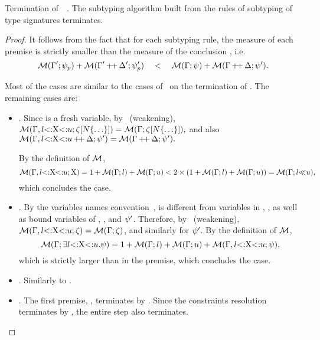 \begin{theorem}{Termination of\ \ .}%
\label{thm:subtysig-terminates}
    The subtyping algorithm built from the rules of
    subtyping of type signatures
     terminates.
\end{theorem}
\begin{proof}
    It follows from the fact that for each subtyping rule, 
    the measure of each premise 
    is strictly smaller than the measure 
    of the conclusion , i.e.
    \[\operatorname{\mathcal{M}}(\Gamma';\psi_p) + \operatorname{\mathcal{M}}(\Gamma'\operatorname{+\!+}\Delta';\psi'_p) \quad<\quad 
    \operatorname{\mathcal{M}}(\Gamma;\psi) + \operatorname{\mathcal{M}}(\Gamma\operatorname{+\!+}\Delta;\psi').\]

    Most of the cases are similar to the cases of~
    on the termination of .
    The remaining cases are:
    \begin{itemize}
        \item {}. Since \vx is a fresh variable,
            by~ (weakening),
            $\operatorname{\mathcal{M}}(\Gamma, l{\operatorname{<:}}\mathrm{X}{\operatorname{<:}}u;\zeta[N\{\ldots\}]) = 
            \operatorname{\mathcal{M}}(\Gamma;\zeta[N\{\ldots\}]),$ and also
            $\operatorname{\mathcal{M}}(\Gamma, l{\operatorname{<:}}\mathrm{X}{\operatorname{<:}}u\operatorname{+\!+}\Delta;\psi')
            = \operatorname{\mathcal{M}}(\Gamma\operatorname{+\!+}\Delta;\psi').$

            By the definition of $\operatorname{\mathcal{M}}$,
            \[\operatorname{\mathcal{M}}(\Gamma, l{\operatorname{<:}}\mathrm{X}{\operatorname{<:}}u;\mathrm{X}) =
            1 + \operatorname{\mathcal{M}}(\Gamma;l) + \operatorname{\mathcal{M}}(\Gamma;u) <
            2\times(1 + \operatorname{\mathcal{M}}(\Gamma;l) + \operatorname{\mathcal{M}}(\Gamma;u)) =
            \operatorname{\mathcal{M}}(\Gamma;l{\operatorname{\ll}}u),\]
            which concludes the case.
        \item {}. By the variables names
            convention~, \vx is different from variables
            in \AEnv, \UEnv, as well as bound variables of \dctxsig, \tysig,
            and $\psi'$. Therefore, by~ (weakening),
            $\operatorname{\mathcal{M}}(\Gamma, l{\operatorname{<:}}\mathrm{X}{\operatorname{<:}}u;\zeta) = 
            \operatorname{\mathcal{M}}(\Gamma;\zeta)$, and similarly for $\psi'$.
            By the definition of $\operatorname{\mathcal{M}}$,
            \[\operatorname{\mathcal{M}}(\Gamma;\exists l{\operatorname{<:}}\mathrm{X}{\operatorname{<:}}u.\psi) = 1 +
                \operatorname{\mathcal{M}}(\Gamma;l) + \operatorname{\mathcal{M}}(\Gamma;u) + 
                \operatorname{\mathcal{M}}(\Gamma, l{\operatorname{<:}}\mathrm{X}{\operatorname{<:}}u;\psi),\]
            which is strictly larger than
            \tymsr{\AEnv, \varbound{\vx}{\tylb}{\tyub}}{\tysig} in the premise,
            which concludes the case.
        \item {}. Similarly to .
        \item {}. The first premise,
            ,
            terminates by .
            Since the constraints resolution \solvectrdflt terminates
            by , the entire step also terminates.
    \end{itemize}
\end{proof}


